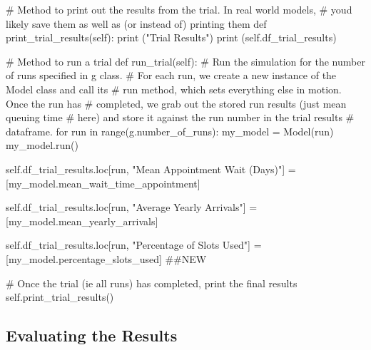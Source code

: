 \documentclass[
  letterpaper,
  DIV=11,
  numbers=noendperiod]{scrreprt}
\newenvironment{Shaded}{}{}
\newcommand{\BuiltInTok}[1]{\textcolor[rgb]{0.84,0.23,0.29}{#1}}
\newcommand{\CommentTok}[1]{\textcolor[rgb]{0.42,0.45,0.49}{#1}}
\newcommand{\ControlFlowTok}[1]{\textcolor[rgb]{0.84,0.23,0.29}{#1}}
\newcommand{\KeywordTok}[1]{\textcolor[rgb]{0.84,0.23,0.29}{#1}}
\newcommand{\NormalTok}[1]{\textcolor[rgb]{0.14,0.16,0.18}{#1}}
\newcommand{\OperatorTok}[1]{\textcolor[rgb]{0.14,0.16,0.18}{#1}}
\newcommand{\StringTok}[1]{\textcolor[rgb]{0.01,0.18,0.38}{#1}}
\newcommand{\VariableTok}[1]{\textcolor[rgb]{0.89,0.38,0.04}{#1}}
\begin{document}
\begin{Shaded}
\begin{Highlighting}[]
    \CommentTok{\# Method to print out the results from the trial.  In real world models,}
    \CommentTok{\# you\textquotesingle{}d likely save them as well as (or instead of) printing them}
    \KeywordTok{def}\NormalTok{ print\_trial\_results(}\VariableTok{self}\NormalTok{):}
        \BuiltInTok{print}\NormalTok{ (}\StringTok{"Trial Results"}\NormalTok{)}
        \BuiltInTok{print}\NormalTok{ (}\VariableTok{self}\NormalTok{.df\_trial\_results)}

    \CommentTok{\# Method to run a trial}
    \KeywordTok{def}\NormalTok{ run\_trial(}\VariableTok{self}\NormalTok{):}
        \CommentTok{\# Run the simulation for the number of runs specified in g class.}
        \CommentTok{\# For each run, we create a new instance of the Model class and call its}
        \CommentTok{\# run method, which sets everything else in motion.  Once the run has}
        \CommentTok{\# completed, we grab out the stored run results (just mean queuing time}
        \CommentTok{\# here) and store it against the run number in the trial results}
        \CommentTok{\# dataframe.}
        \ControlFlowTok{for}\NormalTok{ run }\KeywordTok{in} \BuiltInTok{range}\NormalTok{(g.number\_of\_runs):}
\NormalTok{            my\_model }\OperatorTok{=}\NormalTok{ Model(run)}
\NormalTok{            my\_model.run()}

            \VariableTok{self}\NormalTok{.df\_trial\_results.loc[run, }\StringTok{"Mean Appointment Wait (Days)"}\NormalTok{] }\OperatorTok{=}\NormalTok{ [my\_model.mean\_wait\_time\_appointment]}

            \VariableTok{self}\NormalTok{.df\_trial\_results.loc[run, }\StringTok{"Average Yearly Arrivals"}\NormalTok{] }\OperatorTok{=}\NormalTok{ [my\_model.mean\_yearly\_arrivals]}

            \VariableTok{self}\NormalTok{.df\_trial\_results.loc[run, }\StringTok{"Percentage of Slots Used"}\NormalTok{] }\OperatorTok{=}\NormalTok{ [my\_model.percentage\_slots\_used] }\CommentTok{\#\#NEW}

        \CommentTok{\# Once the trial (ie all runs) has completed, print the final results}
        \VariableTok{self}\NormalTok{.print\_trial\_results()}
\end{Highlighting}
\end{Shaded}

\subsection{Evaluating the Results}\label{evaluating-the-results-1}
\end{document}
